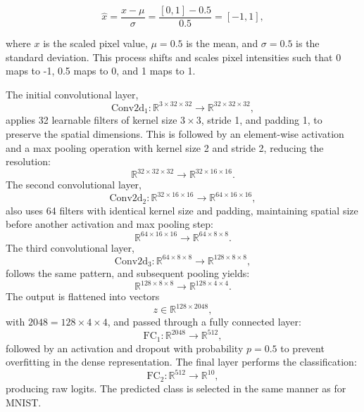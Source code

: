 \documentclass{article}
\begin{document}
\[
\hat{x} = \frac{x - \mu}{\sigma} = \frac{[0, 1] - 0.5}{0.5} = [-1, 1],
\]


\vspace{4pt}
\noindent
where \(x\) is the scaled pixel value, \(\mu = 0.5\) is the mean, and \(\sigma = 0.5\) is the standard deviation. This process shifts and scales pixel intensities such that 0 maps to -1, 0.5 maps to 0, and 1 maps to 1.





\vspace{4pt}
\noindent
The initial convolutional layer,
\[
\text{Conv2d}_1 : \mathbb{R}^{3 \times 32 \times 32} \rightarrow \mathbb{R}^{32 \times 32 \times 32},
\]
applies 32 learnable filters of kernel size \(3 \times 3\), stride 1, and padding 1, to preserve the spatial dimensions. This is followed by an element-wise activation and a max pooling operation with kernel size 2 and stride 2, reducing the resolution:
\[
\mathbb{R}^{32 \times 32 \times 32} \rightarrow \mathbb{R}^{32 \times 16 \times 16}.
\]
The second convolutional layer,
\[
\text{Conv2d}_2 : \mathbb{R}^{32 \times 16 \times 16} \rightarrow \mathbb{R}^{64 \times 16 \times 16},
\]
also uses 64 filters with identical kernel size and padding, maintaining spatial size before another activation and max pooling step:
\[
\mathbb{R}^{64 \times 16 \times 16} \rightarrow \mathbb{R}^{64 \times 8 \times 8}.
\]
The third convolutional layer,
\[
\text{Conv2d}_3 : \mathbb{R}^{64 \times 8 \times 8} \rightarrow \mathbb{R}^{128 \times 8 \times 8},
\]
follows the same pattern, and subsequent pooling yields:
\[
\mathbb{R}^{128 \times 8 \times 8} \rightarrow \mathbb{R}^{128 \times 4 \times 4}.
\]
The output is flattened into vectors 
\[
z \in \mathbb{R}^{128 \times 2048},
\]
with \(2048 = 128 \times 4 \times 4\), and passed through a fully connected layer:
\[
\text{FC}_1 : \mathbb{R}^{2048} \rightarrow \mathbb{R}^{512},
\]
followed by an activation and dropout with probability \(p = 0.5\) to prevent overfitting in the dense representation. The final layer performs the classification:
\[
\text{FC}_2 : \mathbb{R}^{512} \rightarrow \mathbb{R}^{10},
\]
producing raw logits. The predicted class is selected in the same manner as for MNIST.
\end{document}
